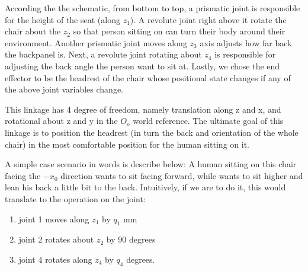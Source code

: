 \documentclass[12pt, letterpaper]{amsart} %
\numberwithin{equation}{section}
\begin{document}
According the the schematic, from bottom to top, a prismatic joint is responsible for the height of the seat (along $z_1$). A revolute joint right above it rotate the chair about the $z_2$  so that person sitting on can turn their body around their environment. Another prismatic joint moves along $z_3$ axis adjusts how far back the backpanel is. Next, a revolute joint rotating about $z_4$ is responsible for adjusting the back angle the person want to sit at. Lastly, we chose the end effector to be the headrest of the chair whose positional state changes if any of the above joint variables change.
\par
This linkage has 4 degree of freedom, namely translation along z and x, and rotational about z and y in the $O_o$ world reference. The ultimate goal of this linkage is to position the headrest (in turn the back and orientation of the whole chair) in the most comfortable position for the human sitting on it.
\par
A simple case scenario in words is describe below: A human sitting on this chair facing the $-x_0$ direction wants to sit facing forward, while wants to sit higher and lean his back a little bit to the back. Intuitively, if we are to do it, this would translate to the operation on the joint:
\begin{enumerate}
\item joint 1 moves along $z_1$ by $q_1$ mm  
\item joint 2 rotates about $z_2$ by 90 degrees
\item joint 4 rotates along $z_4$ by $q_4$ degrees.  
\end{enumerate}
\end{document}
